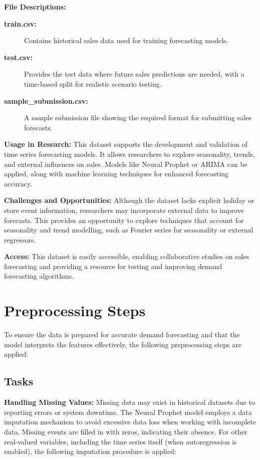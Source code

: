 \textbf{File Descriptions:}
\begin{description}
    \item[\textbf{train.csv:}] Contains historical sales data used for training forecasting models.
    \item[\textbf{test.csv:}] Provides the test data where future sales predictions are needed, with a time-based split for realistic scenario testing.
    \item[\textbf{sample\_submission.csv:}] A sample submission file showing the required format for submitting sales forecasts.
\end{description}

\textbf{Usage in Research:} This dataset supports the development and validation of time series forecasting models. It allows researchers to explore seasonality, trends, and external influences on sales. Models like Neural Prophet or ARIMA can be applied, along with machine learning techniques for enhanced forecasting accuracy.

\textbf{Challenges and Opportunities:} Although the dataset lacks explicit holiday or store event information, researchers may incorporate external data to improve forecasts. This provides an opportunity to explore techniques that account for seasonality and trend modelling, such as Fourier series for seasonality or external regressors.

\textbf{Access:} This dataset is easily accessible, enabling collaborative studies on sales forecasting and providing a resource for testing and improving demand forecasting algorithms.


\section{Preprocessing Steps}

To ensure the data is prepared for accurate demand forecasting and that the model interprets the features effectively, the following preprocessing steps are applied:

\subsection*{Tasks}

\textbf{Handling Missing Values:} Missing data may exist in historical datasets due to reporting errors or system downtime. The Neural Prophet model employs a data imputation mechanism to avoid excessive data loss when working with incomplete data. Missing events are filled in with zeros, indicating their absence. For other real-valued variables, including the time series itself (when autoregression is enabled), the following imputation procedure is applied:

